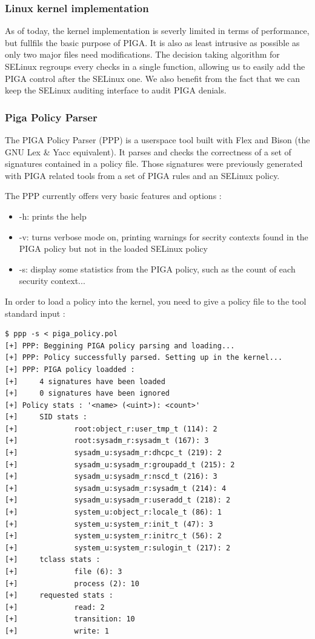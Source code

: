 \documentclass[pdftex,a4paper,titlepage,11pt]{article}
\begin{document}
\subsubsection{Linux kernel implementation}

As of today, the kernel implementation is severly limited in terms of performance, but fullfils the basic purpose of PIGA.
It is also as least intrusive as possible as only two major files need modifications. The decision taking algorithm for SELinux regroups every checks in a single function, allowing us to easily add the PIGA control after the SELinux one.
We also benefit from the fact that we can keep the SELinux auditing interface to audit PIGA denials.

\subsubsection{Piga Policy Parser}

The PIGA Policy Parser (PPP) is a userspace tool built with Flex and Bison (the GNU Lex \& Yacc equivalent). It parses and checks the correctness of a set of signatures contained in a policy file. Those signatures were previously generated with PIGA related tools from a set of PIGA rules and an SELinux policy.

The PPP currently offers very basic features and options :
\begin{itemize}
	\item -h: prints the help
	\item -v: turns verbose mode on, printing warnings for secrity contexts found in the PIGA policy but not in the loaded SELinux policy
	\item -s: display some statistics from the PIGA policy, such as the count of each security context...
\end{itemize}

\smallskip

In order to load a policy into the kernel, you need to give a policy file to the tool standard input :
\begin{verbatim}
$ ppp -s < piga_policy.pol
[+] PPP: Beggining PIGA policy parsing and loading...
[+] PPP: Policy successfully parsed. Setting up in the kernel...
[+] PPP: PIGA policy loadded :
[+]     4 signatures have been loaded
[+]     0 signatures have been ignored
[+] Policy stats : '<name> (<uint>): <count>'
[+]     SID stats :
[+]             root:object_r:user_tmp_t (114): 2
[+]             root:sysadm_r:sysadm_t (167): 3
[+]             sysadm_u:sysadm_r:dhcpc_t (219): 2
[+]             sysadm_u:sysadm_r:groupadd_t (215): 2
[+]             sysadm_u:sysadm_r:nscd_t (216): 3
[+]             sysadm_u:sysadm_r:sysadm_t (214): 4
[+]             sysadm_u:sysadm_r:useradd_t (218): 2
[+]             system_u:object_r:locale_t (86): 1
[+]             system_u:system_r:init_t (47): 3
[+]             system_u:system_r:initrc_t (56): 2
[+]             system_u:system_r:sulogin_t (217): 2
[+]     tclass stats :
[+]             file (6): 3
[+]             process (2): 10
[+]     requested stats :
[+]             read: 2
[+]             transition: 10
[+]             write: 1
\end{verbatim}
\end{document}

